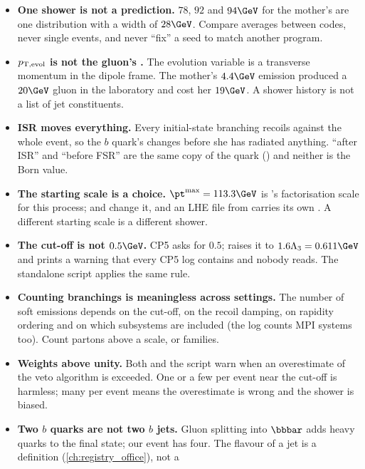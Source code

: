 \begin{pitfalls}
\begin{itemize}[nosep]
  \item \textbf{One shower is not a prediction.} $78$, $92$ and $94\GeV$
    for the mother's \pt are one distribution with a width of $28\GeV$.
    Compare averages between codes, never single events, and never ``fix''
    a seed to match another program.
  \item \textbf{$p_{\mathrm{T,evol}}$ is not the gluon's \pt.} The evolution
    variable is a transverse momentum in the dipole frame. The mother's
    $4.4\GeV$ emission produced a $20\GeV$ gluon in the laboratory and cost
    her $19\GeV$. A shower history is not a list of jet constituents.
  \item \textbf{ISR moves everything.} Every initial-state branching
    recoils against the whole event, so the $b$ quark's \pt changes before
    she has radiated anything. ``\pt after ISR'' and ``\pt before FSR'' are
    the same copy of the quark () and neither is
    the Born value.
  \item \textbf{The starting scale is a choice.} $\pt^{\max}=113.3\GeV$ is
    \PYTHIA's factorisation scale for this process;  and
     change it, and an LHE file from \MG carries its own
    . A different starting scale is a different shower.
  \item \textbf{The cut-off is not $0.5\GeV$.} CP5 asks for $0.5$;
    \PYTHIA raises it to $1.6\Lambda_3=0.611\GeV$ and prints a warning that
    every CP5 log contains and nobody reads. The standalone script applies
    the same rule.
  \item \textbf{Counting branchings is meaningless across settings.} The
    number of soft emissions depends on the cut-off, on the recoil damping,
    on rapidity ordering and on which subsystems are included (the \CMSSW
    log counts MPI systems too). Count partons above a scale, or families.
  \item \textbf{Weights above unity.} Both \PYTHIA and the script warn when
    an overestimate of the veto algorithm is exceeded. One or a few per
    event near the cut-off is harmless; many per event means the
    overestimate is wrong and the shower is biased.
  \item \textbf{Two $b$ quarks are not two $b$ jets.} Gluon splitting into
    $\bbbar$ adds heavy quarks to the final state; our event has four. The
    flavour of a jet is a definition (\cref{ch:registry_office}), not a

\end{itemize}
\end{pitfalls}
